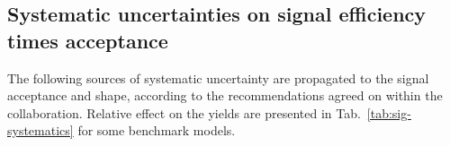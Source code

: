 
%

\clearpage
\subsection{Systematic uncertainties on signal efficiency times acceptance}
\label{sec:sig-syst}

The following sources of systematic uncertainty are propagated to the signal
acceptance and shape, according to the recommendations agreed on within the
collaboration. Relative effect on the yields are presented in
Tab.~\ref{tab:sig-systematics} for some benchmark models.


